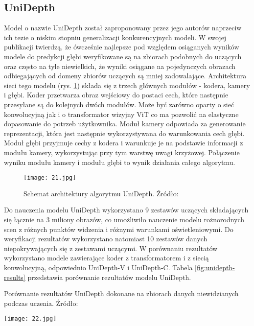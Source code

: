 \subsection{UniDepth}
Model o nazwie UniDepth \cite{piccinelli2024} został zaproponowany przez jego autorów naprzeciw ich tezie o niskim stopniu generalizacji konkurencyjnych modeli. W swojej publikacji twierdzą, że ówcześnie najlepsze pod względem osiąganych wyników modele do predykcji głębi weryfikowane są na zbiorach podobnych do uczących oraz często na tyle niewielkich, że wyniki osiągane na pojedynczych obrazach odbiegających od domeny zbiorów uczących są mniej zadowalające.
Architektura sieci tego modelu (rys. \ref{fig:unidepth-schema}) składa się z trzech głównych modułów - kodera, kamery i głębi. Koder przetwarza obraz wejściowy do postaci cech, które następnie przesyłane są do kolejnych dwóch modułów. Może być zarówno oparty o sieć konwolucyjną jak i o transformator wizyjny ViT co ma pozwolić na elastyczne dopasowanie do potrzeb użytkownika. Moduł kamery odpowiada za generowanie reprezentacji, która jest następnie wykorzystywana do warunkowania cech głębi. Moduł głębi przyjmuje cechy z kodera i warunkuje je na podstawie informacji z modułu kamery, wykorzystując przy tym warstwę uwagi krzyżowej. Połączenie wyniku modułu kamery i modułu głębi to wynik działania całego algorytmu.
\begin{figure}[H]
    \centering
    \texttt{[image: 21.jpg]}
    \caption{Schemat architektury algorytmu UniDepth. Źródło: \cite{piccinelli2024}}
    \label{fig:unidepth-schema}
\end{figure}
Do nauczenia modelu UniDepth wykorzystano 9 zestawów uczących składających się łącznie na 3 miliony obrazów, co umożliwiło nauczenie modelu rożnorodnych scen z różnych punktów widzenia i różnymi warunkami oświetleniowymi. Do weryfikacji rezultatów wykorzystano natomiast 10 zestawów danych niepokrywających się z zestawami uczącymi. W porównaniu rezultatów wykorzystano modele zawierające koder z transformatorem i z siecią konwolucyjną, odpowiednio UniDepth-V i UniDepth-C. Tabela \ref{fig:unidepth-results} przedstawia porównanie rezultatów modelu UniDepth.
\begin{table}[H]
    \centering
    \caption{Porównanie rezultatów UniDepth dokonane na zbiorach danych niewidzianych podczas uczenia. Źródło: \cite{piccinelli2024}}
    \texttt{[image: 22.jpg]}
    \label{fig:unidepth-results}
\end{table}


